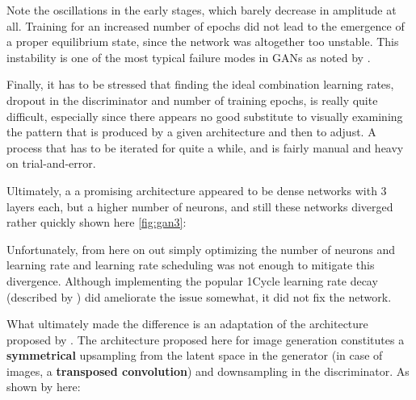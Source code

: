 Note the oscillations in the early stages, which barely decrease in amplitude at all. Training for an increased number of epochs did not lead to the emergence of a proper equilibrium state, since the network was altogether too unstable. This instability is one of the most typical failure modes in \acp{GAN} as noted by \cite{wiatrak2020stabilizing}.

\pagebreak 

Finally, it has to be stressed that finding the ideal combination learning rates, dropout in the discriminator and number of training epochs, is really quite difficult, especially since there appears no good substitute to visually examining the pattern that is produced by a given architecture and then to adjust. A process that has to be iterated for quite a while, and is fairly manual and heavy on trial-and-error.
 
Ultimately, a a promising architecture appeared to be dense networks with 3 layers each, but a higher number of neurons, and still these networks diverged rather quickly shown here \ref{fig:gan3}:
 

Unfortunately, from here on out simply optimizing the number of neurons and learning rate and learning rate scheduling was not enough to mitigate this divergence. Although implementing the popular 1Cycle learning rate decay (described by \cite{smith_1cycle}) did ameliorate the issue somewhat, it did not fix the network.

\pagebreak

What ultimately made the difference is an adaptation of the architecture proposed by \cite{dcgan}. The architecture proposed here for image generation constitutes a \textbf{symmetrical} upsampling from the latent space in the generator (in case of images, a \textbf{transposed convolution}) and downsampling in the discriminator. As shown by \cite{oversampling_gan} here:


